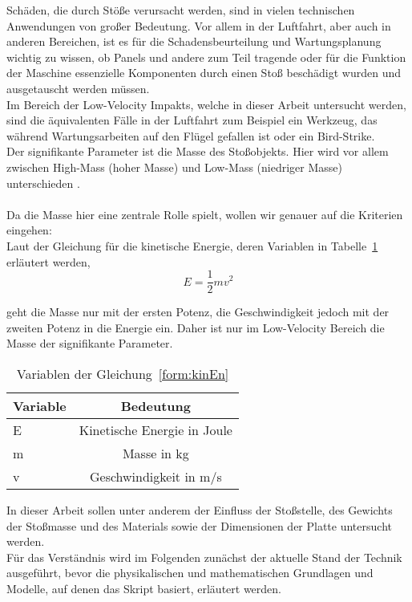 Schäden, die durch Stöße verursacht werden, sind in vielen technischen
Anwendungen von großer Bedeutung. Vor allem in der Luftfahrt, aber auch in
anderen Bereichen, ist es für die Schadensbeurteilung und Wartungsplanung
wichtig zu wissen, ob Panels und andere zum Teil tragende oder für die Funktion
der Maschine essenzielle Komponenten durch einen Stoß beschädigt wurden und
ausgetauscht werden müssen. \\
Im Bereich der Low-Velocity Impakts, welche in dieser Arbeit untersucht werden,
sind die äquivalenten Fälle in der Luftfahrt zum Beispiel ein Werkzeug, das während
Wartungsarbeiten auf den Flügel gefallen ist oder ein Bird-Strike. \\
Der signifikante Parameter ist die Masse des Stoßobjekts. Hier wird vor allem
zwischen High-Mass (hoher Masse) und Low-Mass (niedriger Masse) unterschieden \cite{Olsson.2000}. \\
\\
Da die Masse hier eine zentrale Rolle spielt, wollen wir genauer auf die
Kriterien eingehen: \\
Laut der Gleichung für die kinetische Energie, deren Variablen in Tabelle~\ref{tab:Tabelle 1} erläutert werden,
\begin{equation}
\label{form:kinEn}
E = \frac{1}{2}mv^2
\end{equation}
 
 geht die Masse nur mit der ersten Potenz, die Geschwindigkeit jedoch mit
 der zweiten Potenz in die Energie ein. Daher ist nur im Low-Velocity Bereich die Masse der signifikante Parameter. 
 
\begin{table}[h!]
	\begin{center}
		\caption{Variablen der Gleichung~\ref{form:kinEn}}
		\label{tab:Tabelle 1}
		\begin{tabular}{l|c}
			\textbf{Variable} & \textbf{Bedeutung}\\
			\hline
			E & Kinetische Energie in Joule\\
			m & Masse in kg\\
			v & Geschwindigkeit in m/s\\
		\end{tabular}
	\end{center}
\end{table}

In dieser Arbeit sollen unter anderem der Einfluss der
Stoßstelle, des Gewichts der Stoßmasse und des Materials sowie der Dimensionen der
Platte untersucht werden. \\
Für das Verständnis wird im Folgenden zunächst der aktuelle Stand der
Technik ausgeführt, bevor die physikalischen und mathematischen Grundlagen und
Modelle, auf denen das Skript basiert, erläutert werden.\\
\\
